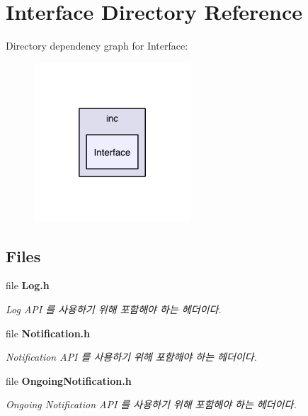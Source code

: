 \section{Interface Directory Reference}
\label{dir_f12671cad1e45398bf1c62a01e7076a3}
Directory dependency graph for Interface\-:\nopagebreak
\begin{figure}[H]
\begin{center}
\leavevmode
\includegraphics[width=166pt]{dir_f12671cad1e45398bf1c62a01e7076a3_dep}
\end{center}
\end{figure}
\subsection*{Files}
\begin{DoxyCompactItemize}
\item 
file {\bf Log.\-h}
\begin{DoxyCompactList}\small\item\em Log A\-P\-I 를 사용하기 위해 포함해야 하는 헤더이다. \end{DoxyCompactList}\item 
file {\bf Notification.\-h}
\begin{DoxyCompactList}\small\item\em Notification A\-P\-I 를 사용하기 위해 포함해야 하는 헤더이다. \end{DoxyCompactList}\item 
file {\bf Ongoing\-Notification.\-h}
\begin{DoxyCompactList}\small\item\em Ongoing Notification A\-P\-I 를 사용하기 위해 포함해야 하는 헤더이다. \end{DoxyCompactList}\end{DoxyCompactItemize}
